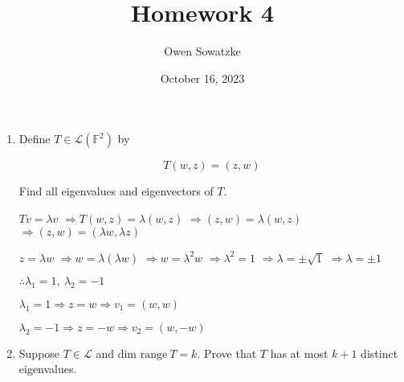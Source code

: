 \documentclass[fleqn]{article}
\title{Homework 4}
\author{Owen Sowatzke}
\date{October 16, 2023}
\makeatletter
\newcommand{\zerodisplayskip}{
	\setlength{\abovedisplayskip}{0pt}%
	\setlength{\belowdisplayskip}{0pt}%
	\setlength{\abovedisplayshortskip}{0pt}%
	\setlength{\belowdisplayshortskip}{0pt}%
	\setlength{\mathindent}{0pt}}
\newenvironment{equationCenter}{\@fleqnfalse\begin{equation*}}{\end{equation*}}
\makeatother
\begin{document}
	\offinterlineskip
	\setlength{\lineskip}{12pt}
	\zerodisplayskip
	\maketitle
	
	\begin{enumerate}[nolistsep]
		\item Define $T \in \mathcal{L}(\mathbb{F}^2)$ by
		
			\begin{equationCenter}
				T(w,z) = (z,w)
			\end{equationCenter}
			
			Find all eigenvalues and eigenvectors of $T$.
	
			$Tv = {\lambda}v$
			$\Rightarrow T(w,z) = \lambda(w,z)$
			$\Rightarrow(z,w) = \lambda(w,z)$
			$\Rightarrow(z,w) = ({\lambda}w,{\lambda}z)$
			
			$z = {\lambda}w$
			$\Rightarrow w = \lambda({\lambda}w)$
			$\Rightarrow w = {\lambda}^2 w$
			$\Rightarrow {\lambda}^2 = 1$
			$\Rightarrow \lambda = \pm \sqrt{1}$
			$\Rightarrow \lambda = \pm 1$
			
			$\therefore \lambda_1 = 1,\ \lambda_2 = -1$
			
			$\lambda_1 = 1 \Rightarrow z = w \Rightarrow v_1 = (w, w)$
			
			$\lambda_2 = -1 \Rightarrow z = -w \Rightarrow v_2 = (w, -w)$
			
		\item Suppose $T \in \mathcal{L}$ and $\text{dim range}\ T = k$. Prove that $T$ has at most $k + 1$ distinct eigenvalues.
	
	\end{enumerate}
\end{document}
